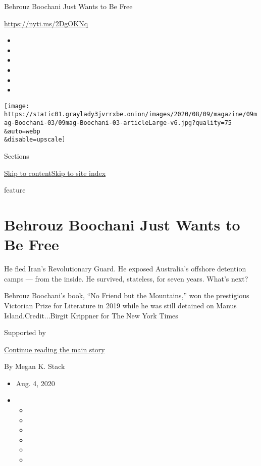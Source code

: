 Behrouz Boochani Just Wants to Be Free

\href{https://nyti.ms/2DgOKNq}{https://nyti.ms/2DgOKNq}

\begin{itemize}
\item
\item
\item
\item
\item
\item
\end{itemize}

\texttt{[image: https://static01.graylady3jvrrxbe.onion/images/2020/08/09/magazine/09mag-Boochani-03/09mag-Boochani-03-articleLarge-v6.jpg?quality=75\\\&auto=webp\\\&disable=upscale]}

Sections

\protect\hyperlink{site-content}{Skip to
content}\protect\hyperlink{site-index}{Skip to site index}

feature

\hypertarget{behrouz-boochani-just-wants-to-be-free}{%
\section{Behrouz Boochani Just Wants to Be
Free}\label{behrouz-boochani-just-wants-to-be-free}}

He fled Iran's Revolutionary Guard. He exposed Australia's offshore
detention camps --- from the inside. He survived, stateless, for seven
years. What's next?

Behrouz Boochani's book, ``No Friend but the Mountains,'' won the
prestigious Victorian Prize for Literature in 2019 while he was still
detained on Manus Island.Credit...Birgit Krippner for The New York Times

Supported by

\protect\hyperlink{after-sponsor}{Continue reading the main story}

By Megan K. Stack

\begin{itemize}
\item
  Aug. 4, 2020
\item
  \begin{itemize}
  \item
  \item
  \item
  \item
  \item
  \item
  \end{itemize}
\end{itemize}

